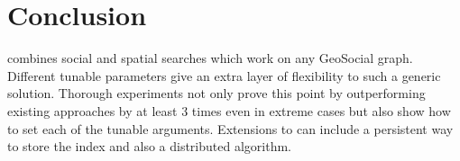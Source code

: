 \section{Conclusion} \label{sec:conclusion}
{\rrp} combines social and spatial searches which work on any GeoSocial graph. Different tunable parameters give an extra layer of flexibility to such a generic solution. Thorough experiments not only prove this point by outperforming existing approaches by at least 3 times even in extreme cases but also show how to set each of the tunable arguments. Extensions to {\rrp} can include a persistent way to store the index and also a distributed {\rrp} algorithm.
